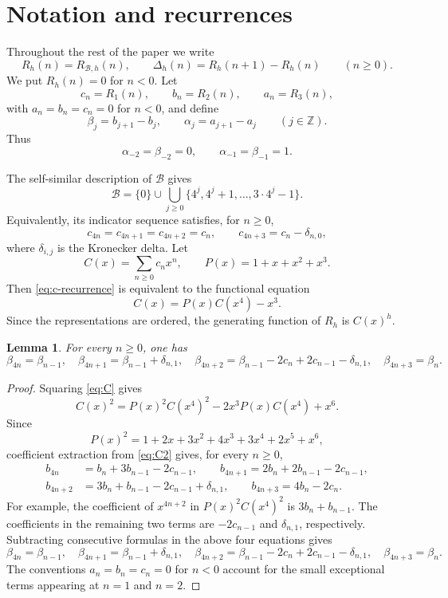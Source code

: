 \documentclass[11pt]{amsart}
\newtheorem{lemma}[theorem]{Lemma}
\theoremstyle{remark}
\theoremstyle{plain}
\newcommand{\BaseB}{\mathcal B}
\begin{document}
\section{Notation and recurrences}

Throughout the rest of the paper we write
\[
R_h(n)=R_{\BaseB,h}(n),\qquad \Delta_h(n)=R_h(n+1)-R_h(n)\qquad (n\ge 0).
\]
We put $R_h(n)=0$ for $n<0$. Let
\[
c_n=R_1(n),\qquad b_n=R_2(n),\qquad a_n=R_3(n),
\]
with $a_n=b_n=c_n=0$ for $n<0$, and define
\[
\beta_j=b_{j+1}-b_j,\qquad \alpha_j=a_{j+1}-a_j\qquad(j\in\mathbb Z).
\]
Thus
\[
\alpha_{-2}=\beta_{-2}=0,\qquad \alpha_{-1}=\beta_{-1}=1.
\]

The self-similar description of $\BaseB$ gives
\[
\BaseB=\{0\}\cup \bigcup_{j\ge 0}\{4^j,4^j+1,\ldots,3\cdot 4^j-1\}.
\]
Equivalently, its indicator sequence satisfies, for $n\ge 0$,
\begin{equation}\label{eq:c-recurrence}
 c_{4n}=c_{4n+1}=c_{4n+2}=c_n,\qquad c_{4n+3}=c_n-\delta_{n,0},
\end{equation}
where $\delta_{i,j}$ is the Kronecker delta. Let
\[
C(x)=\sum_{n\ge 0}c_nx^n,\qquad P(x)=1+x+x^2+x^3.
\]
Then \eqref{eq:c-recurrence} is equivalent to the functional equation
\begin{equation}\label{eq:C}
C(x)=P(x)C(x^4)-x^3.
\end{equation}
Since the representations are ordered, the generating function of $R_h$ is $C(x)^h$.

\begin{lemma}\label{lem:beta-rec}
For every $n\ge 0$, one has
\[
\beta_{4n}=\beta_{n-1},\quad
\beta_{4n+1}=\beta_{n-1}+\delta_{n,1},\quad
\beta_{4n+2}=\beta_{n-1}-2c_n+2c_{n-1}-\delta_{n,1},\quad
\beta_{4n+3}=\beta_n.
\]
\end{lemma}

\begin{proof}
Squaring \eqref{eq:C} gives
\begin{equation}\label{eq:C2}
C(x)^2=P(x)^2C(x^4)^2-2x^3P(x)C(x^4)+x^6.
\end{equation}
Since
\[
P(x)^2=1+2x+3x^2+4x^3+3x^4+2x^5+x^6,
\]
coefficient extraction from \eqref{eq:C2} gives, for every $n\ge 0$,
\[
\begin{aligned}
b_{4n}&=b_n+3b_{n-1}-2c_{n-1},\qquad
b_{4n+1}=2b_n+2b_{n-1}-2c_{n-1},\\
b_{4n+2}&=3b_n+b_{n-1}-2c_{n-1}+\delta_{n,1},\qquad
b_{4n+3}=4b_n-2c_n.
\end{aligned}
\]
For example, the coefficient of $x^{4n+2}$ in $P(x)^2C(x^4)^2$ is $3b_n+b_{n-1}$. The coefficients in the remaining two terms are $-2c_{n-1}$ and $\delta_{n,1}$, respectively. Subtracting consecutive formulas in the above four equations gives
\[
\beta_{4n}=\beta_{n-1},\quad
\beta_{4n+1}=\beta_{n-1}+\delta_{n,1},\quad
\beta_{4n+2}=\beta_{n-1}-2c_n+2c_{n-1}-\delta_{n,1},\quad
\beta_{4n+3}=\beta_n.
\]
The conventions $a_n=b_n=c_n=0$ for $n<0$ account for the small exceptional terms appearing at $n=1$ and $n=2$.
\end{proof}
\end{document}
